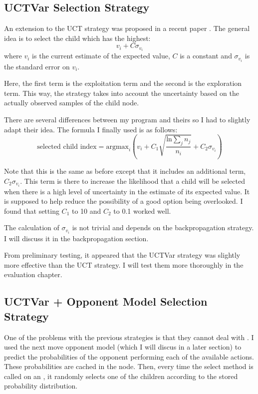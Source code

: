 \subsection{UCTVar Selection Strategy}				%

An extension to the UCT strategy was proposed in a recent paper \cite{mcts-erd}. The general idea is to select the child which has the highest:
\[ v_i + C \sigma_{v_i} \]
where \(v_i\) is the current estimate of the expected value, \(C\) is a constant and \(\sigma_{v_i}\) is the standard error on \(v_i\). 

Here, the first term is the exploitation term and the second is the exploration term. This way, the strategy takes into account the uncertainty based on the actually observed samples of the child node. 

There are several differences between my program and theirs so I had to slightly adapt their idea. The formula I finally used is as follows:
\[ \mbox{selected child index} = \mbox{argmax}_i \left( v_i + C_1 \sqrt{ \frac{\mbox{ln} \sum_j n_j}{n_i} } + C_2 \sigma_{v_i} \right) \]

Note that this is the same as before except that it includes an additional term, \(C_2 \sigma_{v_i}\). This term is there to increase the likelihood that a child will be selected when there is a high level of uncertainty in the estimate of its expected value. It is supposed to help reduce the possibility of a good option being overlooked. I found that setting \(C_1\) to 10 and \(C_2\) to 0.1 worked well. 

The calculation of \(\sigma_{v_i}\) is not trivial and depends on the backpropagation strategy. I will discuss it in the backpropagation section.

From preliminary testing, it appeared that the UCTVar strategy was slightly more effective than the UCT strategy. I will test them more thoroughly in the evaluation chapter. 



\subsection{UCTVar + Opponent Model Selection Strategy}%

One of the problems with the previous strategies is that they cannot deal with \opps. I used the next move opponent model (which I will discus in a later section) 
to predict the probabilities of the opponent performing each of the available actions. These probabilities are cached in the node. Then, every time the select method is called on an \opp, it randomly selects one of the children according to the stored probability distribution. 

